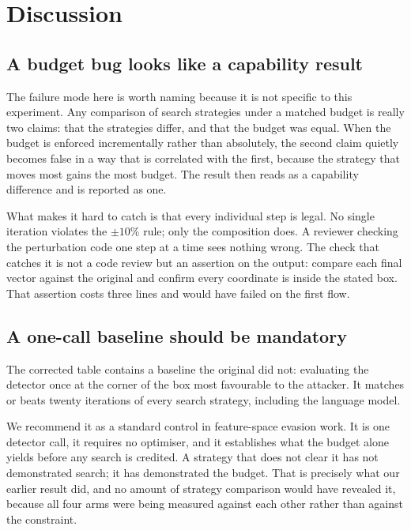 \documentclass[journal]{IEEEtran}
\theoremstyle{definition}
\newcommand{\budgetpct}{10}
\begin{document}


\section{Discussion}
\label{sec:discussion}

\subsection{A budget bug looks like a capability result}
The failure mode here is worth naming because it is not specific to this
experiment. Any comparison of search strategies under a matched budget is
really two claims: that the strategies differ, and that the budget was equal.
When the budget is enforced incrementally rather than absolutely, the second
claim quietly becomes false in a way that is correlated with the first, because
the strategy that moves most gains the most budget. The result then reads as a
capability difference and is reported as one.

What makes it hard to catch is that every individual step is legal. No single
iteration violates the $\pm\budgetpct$\% rule; only the composition does. A
reviewer checking the perturbation code one step at a time sees nothing wrong.
The check that catches it is not a code review but an assertion on the output:
compare each final vector against the original and confirm every coordinate is
inside the stated box. That assertion costs three lines and would have failed
on the first flow.

\subsection{A one-call baseline should be mandatory}
The corrected table contains a baseline the original did not: evaluating the
detector once at the corner of the box most favourable to the attacker. It
matches or beats twenty iterations of every search strategy, including the
language model.

We recommend it as a standard control in feature-space evasion work. It is one
detector call, it requires no optimiser, and it establishes what the budget
alone yields before any search is credited. A strategy that does not clear it
has not demonstrated search; it has demonstrated the budget. That is precisely
what our earlier result did, and no amount of strategy comparison would have
revealed it, because all four arms were being measured against each other rather
than against the constraint.
\end{document}

